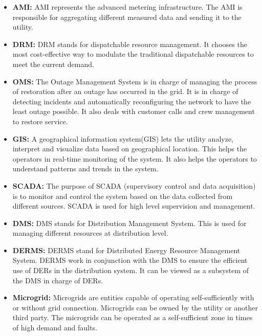  \begin{itemize}
     \item \textbf{AMI:} AMI represents the advanced metering infrastructure. The AMI is responsible for aggregating different measured data and sending it to the utility.
     \item \textbf{DRM:} DRM stands for dispatchable resource management. It chooses the most cost-effective way to modulate the traditional dispatchable resources to meet the current demand.
     \item \textbf{OMS:} The Outage Management System is in charge of managing the process of restoration after an outage has occurred in the grid. It is in charge of detecting incidents and automatically reconfiguring the network to have the least outage possible. It also deals with customer calls and crew management to restore service.
     \item \textbf{GIS:} A geographical information system(GIS) lets the utility analyze, interpret and visualize data based on geographical location. This helps the operators in real-time monitoring of the system. It also helps the operators to understand patterns and trends in the system.
     \item \textbf{SCADA:} The purpose of SCADA (supervisory control and data acquisition) is to monitor and control the system based on the data collected from different sources. SCADA is used for high level supervision and management.
     \item \textbf{DMS:} DMS stands for Distribution Management System. This is used for managing different resources at distribution level.
     \item \textbf{DERMS:} DERMS stand for Distributed Energy Resource Management System. DERMS work in conjunction with the DMS to ensure the efficient use of DERs in the distribution system. It can be viewed as a subsystem of the DMS in charge of DERs.
     \item \textbf{Microgrid:} Microgrids are entities capable of operating self-sufficiently with or without grid connection. Microgrids can be owned by the utility or another third party. The microgrids can be operated as a self-sufficient zone in times of high demand and faults.
 \end{itemize}

